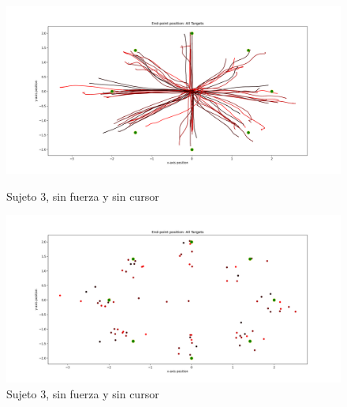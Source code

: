 \documentclass[a4paper,11pt, oneside]{book}
\begin{document}
\begin{figure}[H]
	\begin{minipage}[b]{0.5\linewidth}
		\centering
		\includegraphics[width=\linewidth]{sujeto3/no_force_no_cursor/trayectorias}
		\caption{Sujeto 3, sin fuerza y sin cursor}
		\label{fig:figura1}
	\end{minipage}
	\hspace{0.5cm}
	\begin{minipage}[b]{0.5\linewidth}
		\centering
		\includegraphics[width=\linewidth]{sujeto3/no_force_no_cursor/trayectorias_puntos}
		\caption{Sujeto 3, sin fuerza y sin cursor}
		\label{fig:figura2}
	\end{minipage}
\end{figure}
\end{document}
